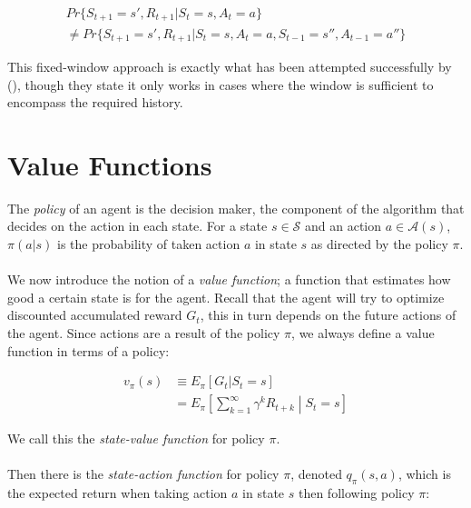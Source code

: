\begin{equation}
\begin{split}
Pr\{S_{t+1}=s', R_{t+1}| S_t = s, A_t = a\} \\
\neq Pr\{S_{t+1}=s', R_{t+1}| S_t = s, A_t = a, S_{t-1} = s'', A_{t-1}=a''\} 
\end{split}
\end{equation}

This fixed-window approach is exactly what has been attempted successfully by
\citeauthor{Lin1992a} (\citeyear{Lin1992a}),
though they state it only works in cases
where the window is sufficient to encompass the required history.

\section{Value Functions}
The \textit{policy} of an agent is the decision maker,
the component of the algorithm that decides on the action in each state.
For a state $s \in \mathcal{S}$
and an action $a \in \mathcal{A}(s)$,
$\pi(a|s)$ is the probability of taken action $a$ in state $s$
as directed by the policy $\pi$.

\paragraph{}
We now introduce the notion of a \textit{value function};
a function that estimates how good a certain state is for the agent.
Recall that the agent will try to optimize discounted accumulated reward $G_t$,
this in turn depends on the future actions of the agent.
Since actions are a result of the policy $\pi$,
we always define a value function in terms of a policy:

\begin{equation}
  \begin{split}
    v_\pi(s) &\equiv E_\pi[G_t | S_t = s] \\
    &= E_\pi \left[ \sum^\infty_{k=1}\gamma^kR_{t+k} \middle| S_t = s \right]
  \end{split}
\end{equation}

We call this the \textit{state-value function} for policy $\pi$.

\paragraph{}
Then there is the \textit{state-action function} for policy $\pi$,
denoted $q_\pi(s,a)$,
which is the expected return when taking action $a$ in state $s$
then following policy $\pi$:

